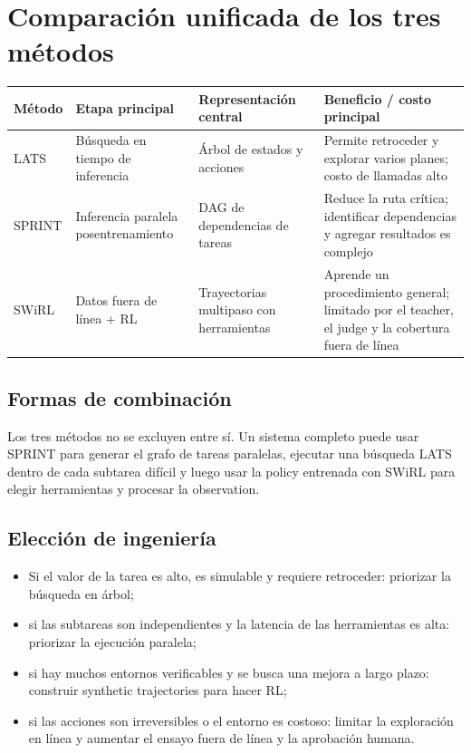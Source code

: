 \section{Comparación unificada de los tres métodos}

\begin{table}[H]
\centering
\small
\begin{tabular}{>{\raggedright\arraybackslash}p{2.2cm}>{\raggedright\arraybackslash}p{3.4cm}>{\raggedright\arraybackslash}p{3.4cm}>{\raggedright\arraybackslash}p{4.2cm}}
\toprule
\textbf{Método} & \textbf{Etapa principal} & \textbf{Representación central} & \textbf{Beneficio / costo principal} \\
\midrule
LATS & Búsqueda en tiempo de inferencia & Árbol de estados y acciones & Permite retroceder y explorar varios planes; costo de llamadas alto \\
SPRINT & Inferencia paralela posentrenamiento & DAG de dependencias de tareas & Reduce la ruta crítica; identificar dependencias y agregar resultados es complejo \\
SWiRL & Datos fuera de línea + RL & Trayectorias multipaso con herramientas & Aprende un procedimiento general; limitado por el teacher, el judge y la cobertura fuera de línea \\
\bottomrule
\end{tabular}
\end{table}

\subsection{Formas de combinación}

Los tres métodos no se excluyen entre sí. Un sistema completo puede usar SPRINT para generar el grafo de tareas paralelas, ejecutar una búsqueda LATS dentro de cada subtarea difícil y luego usar la policy entrenada con SWiRL para elegir herramientas y procesar la observation.

\subsection{Elección de ingeniería}

\begin{itemize}
    \item Si el valor de la tarea es alto, es simulable y requiere retroceder: priorizar la búsqueda en árbol;
    \item si las subtareas son independientes y la latencia de las herramientas es alta: priorizar la ejecución paralela;
    \item si hay muchos entornos verificables y se busca una mejora a largo plazo: construir synthetic trajectories para hacer RL;
    \item si las acciones son irreversibles o el entorno es costoso: limitar la exploración en línea y aumentar el ensayo fuera de línea y la aprobación humana.
\end{itemize}

